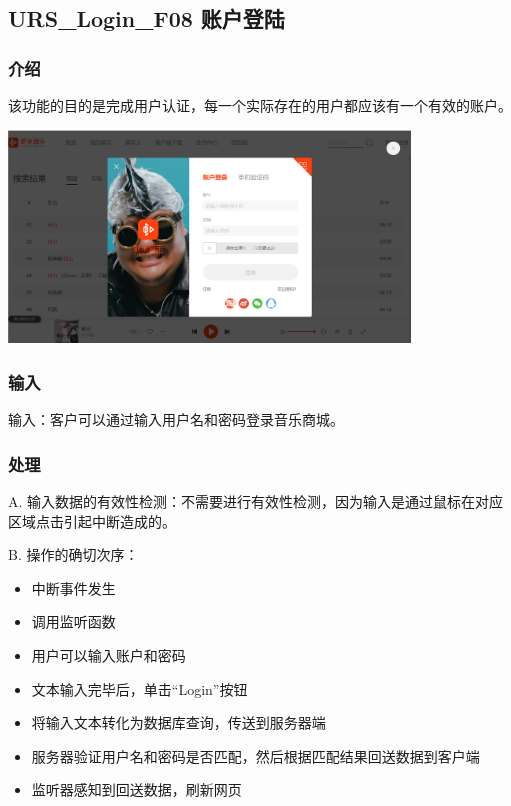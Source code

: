 	  \subsection{URS\_Login\_F08 账户登陆}
	
	  \subsubsection{介绍}
	  该功能的目的是完成用户认证，每一个实际存在的用户都应该有一个有效的账户。
	  \begin{center} 
		\includegraphics[width=0.8\textwidth]{./figures/capture4.png} 
		\end{center}
	  \subsubsection{输入}
	  
	  输入：客户可以通过输入用户名和密码登录音乐商城。
	  
	  \subsubsection{处理}
	  
	  
	  
	  A. 输入数据的有效性检测：不需要进行有效性检测，因为输入是通过鼠标在对应区域点击引起中断造成的。
	  
	  B. 操作的确切次序：
	  \begin{adjustwidth}{2cm}{1cm}\qquad
		  \begin{itemize}
			  \item 中断事件发生
			  \item 调用监听函数
			  \item 用户可以输入账户和密码
			  \item 文本输入完毕后，单击“Login”按钮
			  \item 将输入文本转化为数据库查询，传送到服务器端
			  \item 服务器验证用户名和密码是否匹配，然后根据匹配结果回送数据到客户端
			  \item 监听器感知到回送数据，刷新网页
		  \end{itemize}		
	  \end{adjustwidth}
	   
